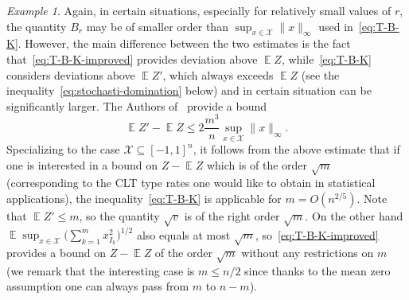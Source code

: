 \documentclass[a4paper]{amsart}
\theoremstyle{definition}
\theoremstyle{remark}
\newtheorem{example}[theorem]{Example}
\numberwithin{equation}{section}
\DeclareMathOperator{\EE}{\mathbb{E}} %
\begin{document}
\begin{example}
Again, in certain situations, especially for  relatively small values of $r$, the quantity $B_r$  may be of smaller order than $\sup_{x\in \mathcal{X}} \|x\|_\infty$ used in~\eqref{eq:T-B-K}. However, the main difference between the two estimates is the fact that~\eqref{eq:T-B-K-improved} provides deviation above $\EE Z$, while~\eqref{eq:T-B-K} considers deviations above $\EE Z'$, which always exceeds $\EE Z$ (see the inequality~\eqref{eq:stochasti-domination} below) and in certain situation can be significantly larger. The Authors of~\cite{MR3480745} provide a bound
\begin{displaymath}
\EE Z' - \EE Z \le 2\frac{m^3}{n}\sup_{x\in \mathcal{X}}\|x\|_\infty.
\end{displaymath}
Specializing to the case $\mathcal{X} \subseteq [-1,1]^n$, it follows from the above estimate that if one is interested in a bound on $Z - \EE Z$ which is of the order $\sqrt{m}$ (corresponding to the CLT type rates one would like to obtain in statistical applications), the inequality~\eqref{eq:T-B-K} is applicable for $m = O(n^{2/5})$. Note that $\EE Z' \le m$, so the quantity $\sqrt{v}$ is of the right order $\sqrt{m}$. On the other hand $\EE \sup_{x \in \mathcal{X}} \Big(\sum_{k=1}^m x_{I_k}^2\Big)^{1/2}$ also equals at most $\sqrt{m}$, so~\eqref{eq:T-B-K-improved} provides a bound on $Z - \EE Z$ of the order $\sqrt{m}$ without any restrictions on $m$ (we remark that the interesting case is $m \le n/2$ since thanks to the mean zero assumption one can always pass from $m$ to $n-m$).



\end{example}
\end{document}
